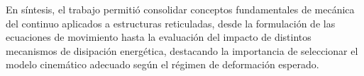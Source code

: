 \documentclass[12pt]{article}
\begin{document}
En síntesis, el trabajo permitió consolidar conceptos fundamentales de mecánica del continuo aplicados a estructuras reticuladas, desde la formulación de las ecuaciones de movimiento hasta la evaluación del impacto de distintos mecanismos de disipación energética, destacando la importancia de seleccionar el modelo cinemático adecuado según el régimen de deformación esperado.
\end{document}
